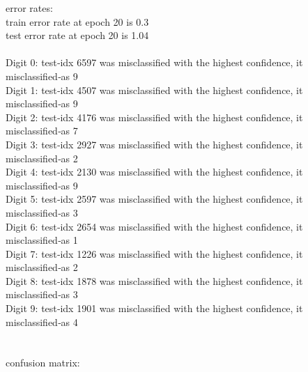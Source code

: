 \documentclass{article}
\begin{document}
error rates:
\\train error rate at epoch 20 is 0.3%
\\test error rate at epoch 20 is 1.04%
\\
\\
Digit 0: test‑idx  6597 was misclassified with the highest confidence, it misclassified‑as 9\\
Digit 1: test‑idx  4507 was misclassified with the highest confidence, it misclassified‑as 9\\
Digit 2: test‑idx  4176 was misclassified with the highest confidence, it misclassified‑as 7\\
Digit 3: test‑idx  2927 was misclassified with the highest confidence, it misclassified‑as 2\\
Digit 4: test‑idx  2130 was misclassified with the highest confidence, it misclassified‑as 9\\
Digit 5: test‑idx  2597 was misclassified with the highest confidence, it misclassified‑as 3\\
Digit 6: test‑idx  2654 was misclassified with the highest confidence, it misclassified‑as 1\\
Digit 7: test‑idx  1226 was misclassified with the highest confidence, it misclassified‑as 2\\
Digit 8: test‑idx  1878 was misclassified with the highest confidence, it misclassified‑as 3\\
Digit 9: test‑idx  1901 was misclassified with the highest confidence, it misclassified‑as 4\\
\\
\\
confusion matrix: \\
\end{document}
